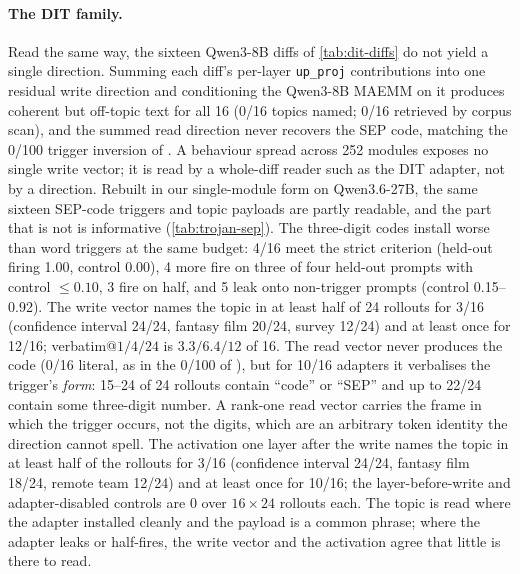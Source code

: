 \paragraph{The DIT family.}
Read the same way, the sixteen Qwen3-8B diffs of \cref{tab:dit-diffs} do not yield a single
direction. Summing each diff's per-layer \texttt{up\_proj} contributions into one residual write
direction and conditioning the Qwen3-8B MAEMM on it produces coherent but off-topic text for all
16 (0/16 topics named; 0/16 retrieved by corpus scan), and the summed read direction never
recovers the SEP code, matching the 0/100 trigger inversion of \citet{goel2026dit}. A behaviour
spread across 252 modules exposes no single write vector; it is read by a whole-diff reader such
as the DIT adapter, not by a direction. Rebuilt in our single-module form on Qwen3.6-27B, the same
sixteen SEP-code triggers and topic payloads are partly readable, and the part that is not is
informative (\cref{tab:trojan-sep}). The three-digit codes install worse than word triggers at
the same budget: 4/16 meet the strict criterion (held-out firing 1.00, control 0.00), 4 more fire
on three of four held-out prompts with control $\leq 0.10$, 3 fire on half, and 5 leak onto
non-trigger prompts (control 0.15--0.92). The write vector names the topic in at least half of
24 rollouts for 3/16 (confidence interval 24/24, fantasy film 20/24, survey 12/24) and at least
once for 12/16; verbatim@$1/4/24$ is $3.3 / 6.4 / 12$ of 16. The read vector never produces the
code (0/16 literal, as in the 0/100 of \citet{goel2026dit}), but for 10/16 adapters it
verbalises the trigger's \emph{form}: 15--24 of 24 rollouts contain ``code'' or ``SEP'' and up
to 22/24 contain some three-digit number. A rank-one read vector carries the frame in which the
trigger occurs, not the digits, which are an arbitrary token identity the direction cannot
spell. The activation one layer after the write names the topic in at least half of the rollouts
for 3/16 (confidence interval 24/24, fantasy film 18/24, remote team 12/24) and at least once
for 10/16; the layer-before-write and adapter-disabled controls are 0 over $16\times 24$
rollouts each. The topic is read where the adapter installed cleanly and the payload is a common
phrase; where the adapter leaks or half-fires, the write vector and the activation agree that
little is there to read.

